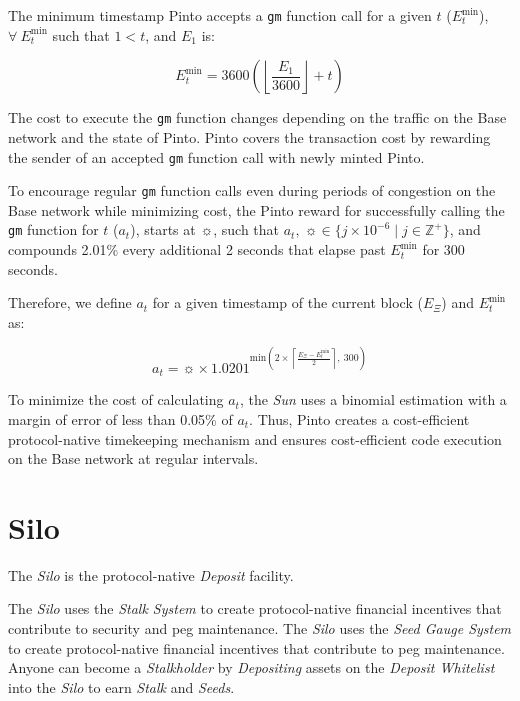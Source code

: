 \documentclass[tikz]{article}
\newcommand{\code}[1]{\texttt{#1}}
\newcommand{\term}[1]{\textsl{#1}}
\begin{document}
The minimum timestamp Pinto accepts a \code{gm} function call for a given $t$ ($E_{t}^{\text{min}}$), $\forall\ E_{t}^{\text{min}}$ such that $1 < t$, and $E_{1}$ is:

    $$
        E_{t}^{\text{min}} = 
            3600{\left
                ({\left\lfloor\frac{E_{1}}{3600}\right\rfloor} + t\right)}
    $$

The cost to execute the \code{gm} function changes depending on the traffic on the Base network and the state of Pinto. Pinto covers the transaction cost by rewarding the sender of an accepted \code{gm} function call with newly minted Pinto. 

To encourage regular \code{gm} function calls even during periods of congestion on the Base network while minimizing cost, the Pinto reward for successfully calling the \code{gm} function for $t$ ($a_{t}$), starts at $\sun$, such that $a_{t},\ \sun \in \{j \times 10^{-6} \mid j \in \mathbb{Z}^{+} \}$, and compounds 2.01\% every additional 2 seconds that elapse past $E_{t}^{\text{min}}$ for 300 seconds.

Therefore, we define $a_{t}$ for a given timestamp of the current block ($E_{\Xi}$) and $E_{t}^{\text{min}}$ as:

    $$ 
        a_{t} = \sun \times 1.0201^{\text{min}(
                    2 \times \left \lceil \frac{E_{\Xi} - E_{t}^{\text{min}}}{2} \right \rceil,\ 
                    300)}
    $$

To minimize the cost of calculating $a_{t}$, the \term{Sun} uses a binomial estimation with a margin of error of less than 0.05\% of $a_{t}$. Thus, Pinto creates a cost-efficient protocol-native timekeeping mechanism and ensures cost-efficient code execution on the Base network at regular intervals.


\vspace*{-1mm}
\section{Silo}
\vspace*{-1mm}

The \term{Silo} is the protocol-native \term{Deposit} facility.

The \term{Silo} uses the \term{Stalk System} to create protocol-native financial incentives that contribute to security and peg maintenance. The \term{Silo} uses the \term{Seed Gauge System} to create protocol-native financial incentives that contribute to peg maintenance. Anyone can become a \term{Stalkholder} by \term{Depositing} assets on the \term{Deposit Whitelist} into the \term{Silo} to earn \term{Stalk} and \term{Seeds}.
\end{document}
